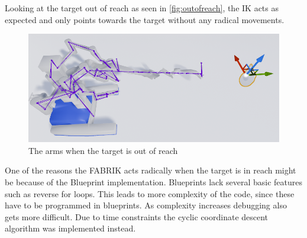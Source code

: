 Looking at the target out of reach as seen in \autoref{fig:outofreach}, the IK acts as expected and only points towards the target without any radical movements. 

\begin{figure}[hbtp]
\centering
\includegraphics[width=1\textwidth]{FABRIK/Robot_OutOfReach.PNG}
\caption{The arms when the target is out of reach}
\end{figure}

One of the reasons the FABRIK acts radically when the target is in reach might be because of the Blueprint implementation. Blueprints lack several basic features such as reverse for loops. This leads to more complexity of the code, since these have to be programmed in blueprints. As complexity increases debugging also gets more difficult. 
Due to time constraints the cyclic coordinate descent algorithm was implemented instead. 